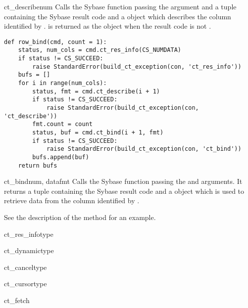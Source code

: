 \begin{methoddesc}[CS_COMMAND]{ct_describe}{num}
Calls the Sybase  function passing the
 argument and a tuple containing the Sybase result code and
a  object which describes the column identified by
.  is returned as the  object
when the result code is not .

\begin{verbatim}
def row_bind(cmd, count = 1):
    status, num_cols = cmd.ct_res_info(CS_NUMDATA)
    if status != CS_SUCCEED:
        raise StandardError(build_ct_exception(con, 'ct_res_info'))
    bufs = []
    for i in range(num_cols):
        status, fmt = cmd.ct_describe(i + 1)
        if status != CS_SUCCEED:
            raise StandardError(build_ct_exception(con, 'ct_describe'))
        fmt.count = count
        status, buf = cmd.ct_bind(i + 1, fmt)
        if status != CS_SUCCEED:
            raise StandardError(build_ct_exception(con, 'ct_bind'))
        bufs.append(buf)
    return bufs
\end{verbatim}
\end{methoddesc}

\begin{methoddesc}[CS_COMMAND]{ct_bind}{num, datafmt}
Calls the Sybase  function passing the 
and  arguments.  It returns a tuple containing the Sybase
result code and a  object which is used to retrieve data
from the column identified by .

See the description of the  method for an
example.
\end{methoddesc}

\begin{methoddesc}[CS_COMMAND]{ct_res_info}{type}
\end{methoddesc}

\begin{methoddesc}[CS_COMMAND]{ct_dynamic}{type \optional{, \ldots}}
\end{methoddesc}

\begin{methoddesc}[CS_COMMAND]{ct_cancel}{type}
\end{methoddesc}

\begin{methoddesc}[CS_COMMAND]{ct_cursor}{type \optional{, \ldots}}
\end{methoddesc}

\begin{methoddesc}[CS_COMMAND]{ct_fetch}{}
\end{methoddesc}

